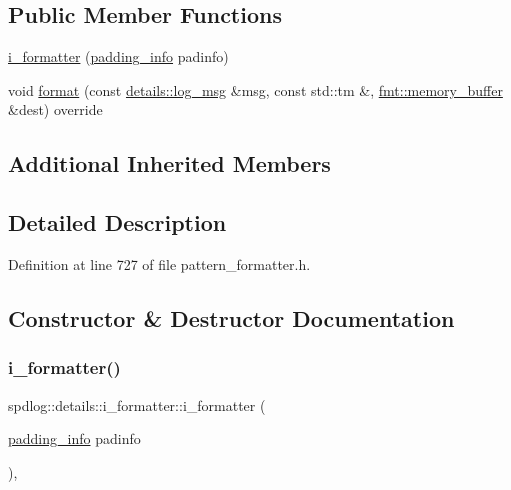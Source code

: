 \subsection*{Public Member Functions}
\begin{DoxyCompactItemize}
\item 
\hyperlink{classspdlog_1_1details_1_1i__formatter_a69d03626d465771f9b6f8ef302114b9c}{i\+\_\+formatter} (\hyperlink{structspdlog_1_1details_1_1padding__info}{padding\+\_\+info} padinfo)
\item 
void \hyperlink{classspdlog_1_1details_1_1i__formatter_aacaecd1c3fd6827287055d2f607f10ed}{format} (const \hyperlink{structspdlog_1_1details_1_1log__msg}{details\+::log\+\_\+msg} \&msg, const std\+::tm \&, \hyperlink{format_8h_a21cbf729f69302f578e6db21c5e9e0d2}{fmt\+::memory\+\_\+buffer} \&dest) override
\end{DoxyCompactItemize}
\subsection*{Additional Inherited Members}


\subsection{Detailed Description}


Definition at line 727 of file pattern\+\_\+formatter.\+h.



\subsection{Constructor \& Destructor Documentation}
\mbox{\label{classspdlog_1_1details_1_1i__formatter_a69d03626d465771f9b6f8ef302114b9c}} 
\subsubsection{\texorpdfstring{i\+\_\+formatter()}{i\_formatter()}}
{\footnotesize\ttfamily spdlog\+::details\+::i\+\_\+formatter\+::i\+\_\+formatter (\begin{DoxyParamCaption}\item[{\hyperlink{structspdlog_1_1details_1_1padding__info}{padding\+\_\+info}}]{padinfo }\end{DoxyParamCaption})\hspace{0.3cm}{\ttfamily [inline]}, {\ttfamily [explicit]}}



